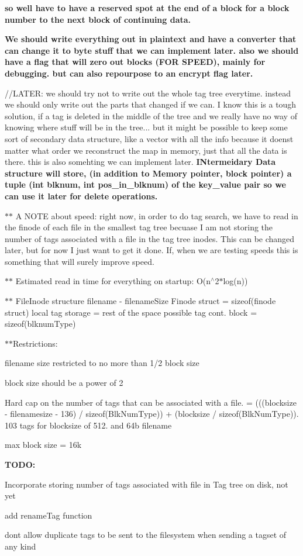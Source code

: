 {\bfseries so we\textquotesingle{}ll have to have a reserved spot at the end of a block for a block number to the next block of continuing data.}

{\bfseries We should write everything out in plaintext and have a converter that can change it to byte stuff that we can implement later. also we should have a flag that will zero out blocks (F\+OR S\+P\+E\+ED), mainly for debugging. but can also repourpose to an encrypt flag later.}

//\+L\+A\+T\+ER\+: we should try not to write out the whole tag tree everytime. instead we should only write out the parts that changed if we can. I know this is a tough solution, if a tag is deleted in the middle of the tree and we really have no way of knowing where stuff will be in the tree... but it might be possible to keep some sort of secondary data structure, like a vector with all the info because it doens\textquotesingle{}t matter what order we reconstruct the map in memory, just that all the data is there. this is also somehting we can implement later. {\bfseries I\+Ntermeidary Data structure will store, (in addition to Memory pointer, block pointer) a tuple (int blknum, int pos\+\_\+in\+\_\+blknum) of the key\+\_\+value pair so we can use it later for delete operations.}

$\ast$$\ast$ A N\+O\+TE about speed\+: right now, in order to do tag search, we have to read in the finode of each file in the smallest tag tree becuase I am not storing the number of tags associated with a file in the tag tree inodes. This can be changed later, but for now I just want to get it done. If, when we are testing speeds this is something that will surely improve speed.

$\ast$$\ast$ Estimated read in time for everything on startup\+: O(n$^\wedge$2$\ast$log(n))

$\ast$$\ast$ File\+Inode structure filename -\/ filename\+Size Finode struct = sizeof(finode struct) local tag storage = rest of the space possible tag cont. block = sizeof(blknum\+Type)

$\ast$$\ast$\+Restrictions\+:
\begin{DoxyEnumerate}
\item filename size restricted to no more than 1/2 block size
\item block size should be a power of 2
\item Hard cap on the number of tags that can be associated with a file. = (((blocksize -\/ filenamesize -\/ 136) / sizeof(\+Blk\+Num\+Type)) + (blocksize / sizeof(\+Blk\+Num\+Type)). 103 tags for blocksize of 512. and 64b filename
\item max block size = 16k
\end{DoxyEnumerate}

{\bfseries T\+O\+DO\+:}
\begin{DoxyEnumerate}
\item Incorporate storing number of tags associated with file in Tag tree on disk, not yet
\item add rename\+Tag function
\item don\textquotesingle{}t allow duplicate tags to be sent to the filesystem when sending a tagset of any kind 
\end{DoxyEnumerate}